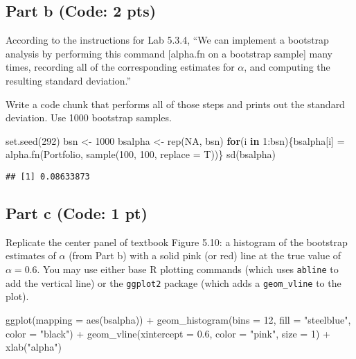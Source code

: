 \documentclass[
]{article}
\newenvironment{Shaded}{\begin{snugshade}}{\end{snugshade}}
\newcommand{\AttributeTok}[1]{\textcolor[rgb]{0.77,0.63,0.00}{#1}}
\newcommand{\ConstantTok}[1]{\textcolor[rgb]{0.00,0.00,0.00}{#1}}
\newcommand{\ControlFlowTok}[1]{\textcolor[rgb]{0.13,0.29,0.53}{\textbf{#1}}}
\newcommand{\DecValTok}[1]{\textcolor[rgb]{0.00,0.00,0.81}{#1}}
\newcommand{\FloatTok}[1]{\textcolor[rgb]{0.00,0.00,0.81}{#1}}
\newcommand{\FunctionTok}[1]{\textcolor[rgb]{0.00,0.00,0.00}{#1}}
\newcommand{\NormalTok}[1]{#1}
\newcommand{\OtherTok}[1]{\textcolor[rgb]{0.56,0.35,0.01}{#1}}
\newcommand{\SpecialCharTok}[1]{\textcolor[rgb]{0.00,0.00,0.00}{#1}}
\newcommand{\StringTok}[1]{\textcolor[rgb]{0.31,0.60,0.02}{#1}}
\begin{document}
\hypertarget{part-b-code-2-pts}{%
\subsection{Part b (Code: 2 pts)}\label{part-b-code-2-pts}}

According to the instructions for Lab 5.3.4, ``We can implement a
bootstrap analysis by performing this command {[}alpha.fn on a bootstrap
sample{]} many times, recording all of the corresponding estimates for
\(\alpha\), and computing the resulting standard deviation.''

Write a code chunk that performs all of those steps and prints out the
standard deviation. Use 1000 bootstrap samples.

\begin{Shaded}
\begin{Highlighting}[]
\FunctionTok{set.seed}\NormalTok{(}\DecValTok{292}\NormalTok{)}
\NormalTok{bsn }\OtherTok{\textless{}{-}} \DecValTok{1000}
\NormalTok{bsalpha }\OtherTok{\textless{}{-}} \FunctionTok{rep}\NormalTok{(}\ConstantTok{NA}\NormalTok{, bsn)}
\ControlFlowTok{for}\NormalTok{(i }\ControlFlowTok{in} \DecValTok{1}\SpecialCharTok{:}\NormalTok{bsn)\{bsalpha[i] }\OtherTok{=} \FunctionTok{alpha.fn}\NormalTok{(Portfolio, }\FunctionTok{sample}\NormalTok{(}\DecValTok{100}\NormalTok{, }\DecValTok{100}\NormalTok{, }\AttributeTok{replace =}\NormalTok{ T))\}}
\FunctionTok{sd}\NormalTok{(bsalpha)}
\end{Highlighting}
\end{Shaded}

\begin{verbatim}
## [1] 0.08633873
\end{verbatim}

\hypertarget{part-c-code-1-pt}{%
\subsection{Part c (Code: 1 pt)}\label{part-c-code-1-pt}}

Replicate the center panel of textbook Figure 5.10: a histogram of the
bootstrap estimates of \(\alpha\) (from Part b) with a solid pink (or
red) line at the true value of \(\alpha = 0.6\). You may use either base
R plotting commands (which uses \texttt{abline} to add the vertical
line) or the \texttt{ggplot2} package (which adds a \texttt{geom\_vline}
to the plot).

\begin{Shaded}
\begin{Highlighting}[]
\FunctionTok{ggplot}\NormalTok{(}\AttributeTok{mapping =} \FunctionTok{aes}\NormalTok{(bsalpha)) }\SpecialCharTok{+}
  \FunctionTok{geom\_histogram}\NormalTok{(}\AttributeTok{bins =} \DecValTok{12}\NormalTok{, }\AttributeTok{fill =} \StringTok{"steelblue"}\NormalTok{, }\AttributeTok{color =} \StringTok{"black"}\NormalTok{) }\SpecialCharTok{+}
  \FunctionTok{geom\_vline}\NormalTok{(}\AttributeTok{xintercept =} \FloatTok{0.6}\NormalTok{, }\AttributeTok{color =} \StringTok{"pink"}\NormalTok{, }\AttributeTok{size =} \DecValTok{1}\NormalTok{) }\SpecialCharTok{+}
  \FunctionTok{xlab}\NormalTok{(}\StringTok{"alpha"}\NormalTok{)}
\end{Highlighting}
\end{Shaded}
\end{document}
